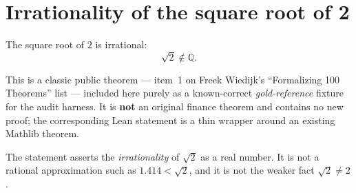 \documentclass{article}
\begin{document}
\section*{Irrationality of the square root of 2}

The square root of $2$ is irrational:
\[
\sqrt{2} \notin \mathbb{Q}.
\]

This is a classic public theorem --- item~1 on Freek Wiedijk's ``Formalizing 100 Theorems'' list
--- included here purely as a known-correct \emph{gold-reference} fixture for the audit harness. It
is \textbf{not} an original finance theorem and contains no new proof; the corresponding Lean
statement is a thin wrapper around an existing Mathlib theorem.

The statement asserts the \emph{irrationality} of $\sqrt{2}$ as a real number. It is not a rational
approximation such as $1.414 < \sqrt{2}$, and it is not the weaker fact $\sqrt{2} \neq 2$.
\end{document}

